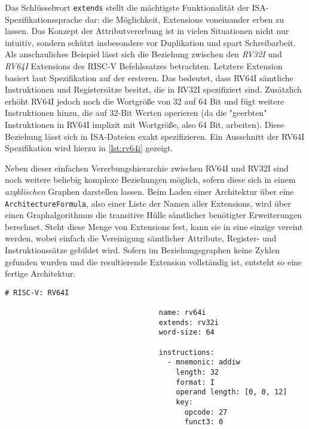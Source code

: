 Das Schlüsselwort \texttt{extends} stellt die mächtigste Funktionalität der
ISA-Spezifikationssprache dar: die Möglichkeit, Extensions voneinander erben zu
lassen. Das Konzept der Attributvererbung ist in vielen Situationen nicht nur
intuitiv, sondern schützt insbesondere vor Duplikation und spart Schreibarbeit.
Als anschauliches Beispiel lässt sich die Beziehung zwischen den \emph{RV32I}
und \emph{RV64I} Extensions des RISC-V Befehlssatzes betrachten. Letztere
Extension basiert laut Spezifikation auf der ersteren. Das bedeutet, dass RV64I
sämtliche Instruktionen und Registersätze besitzt, die in RV32I spezifiziert
sind. Zusätzlich erhöht RV64I jedoch noch die Wortgröße von 32 auf 64 Bit und
fügt weitere Instruktionen hinzu, die auf 32-Bit Werten operieren (da die
"geerbten" Instruktionen in RV64I implizit mit Wortgröße, also 64 Bit,
arbeiten). Diese Beziehung lässt sich in ISA-Dateien exakt spezifizieren. Ein
Ausschnitt der RV64I Spezifikation wird hierzu in \autoref{lst:rv64i} gezeigt.

Neben dieser einfachen Vererbungshierarchie zwischen RV64I und RV32I sind noch
weitere beliebig komplexe Beziehungen möglich, sofern diese sich in einem
\emph{azyklischen} Graphen darstellen lassen. Beim Laden einer Architektur über
eine \texttt{ArchitectureFormula}, also einer Liste der Namen aller Extensions,
wird über einen Graphalgorithmus die transitive Hülle sämtlicher benötigter
Erweiterungen berechnet. Steht diese Menge von Extensions fest, kann sie in eine
einzige vereint werden, wobei einfach die Vereinigung sämtlicher Attribute,
Register- und Instruktionssätze gebildet wird. Sofern im Beziehungsgraphen keine
Zyklen gefunden wurden und die resultierende Extension vollständig ist, entsteht
so eine fertige Architektur.

\begin{table}
\begin{lstlisting}[language=ISA]
                                    # RISC-V: RV64I

                                    name: rv64i
                                    extends: rv32i
                                    word-size: 64

                                    instructions:
                                      - mnemonic: addiw
                                        length: 32
                                        format: I
                                        operand length: [0, 0, 12]
                                        key:
                                          opcode: 27
                                          funct3: 0
\end{lstlisting}
\begin{lstlisting}[caption={Ein Ausschnitt der Definition der RV64I-Extension des RISC-V Befehlssatzes. Zur Vererbung der Attribute von RV32I benötigt es lediglich der Spezifikation der \texttt{extends} Klausel. Zusätzlich wird die Wortgröße sowie eine Hand voll weiterer Befehle neu definiert.}, label={lst:rv64i}]
\end{lstlisting}
\end{table}


